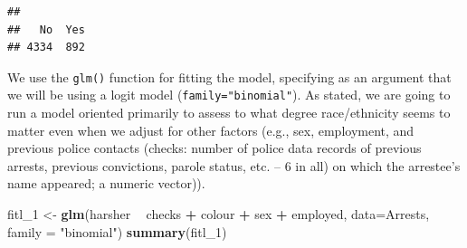 \documentclass[]{book}
\newenvironment{Shaded}{\begin{snugshade}}{\end{snugshade}}
\newcommand{\CommentTok}[1]{\textcolor[rgb]{0.56,0.35,0.01}{\textit{#1}}}
\newcommand{\DataTypeTok}[1]{\textcolor[rgb]{0.13,0.29,0.53}{#1}}
\newcommand{\DecValTok}[1]{\textcolor[rgb]{0.00,0.00,0.81}{#1}}
\newcommand{\KeywordTok}[1]{\textcolor[rgb]{0.13,0.29,0.53}{\textbf{#1}}}
\newcommand{\NormalTok}[1]{#1}
\newcommand{\OperatorTok}[1]{\textcolor[rgb]{0.81,0.36,0.00}{\textbf{#1}}}
\newcommand{\StringTok}[1]{\textcolor[rgb]{0.31,0.60,0.02}{#1}}
\theoremstyle{definition}
\theoremstyle{definition}
\theoremstyle{definition}
\theoremstyle{remark}
\begin{document}
\begin{Shaded}
\end{Shaded}

\begin{verbatim}
## 
##   No  Yes 
## 4334  892
\end{verbatim}

\begin{Shaded}
\end{Shaded}

We use the \texttt{glm()} function for fitting the model, specifying as
an argument that we will be using a logit model
(\texttt{family="binomial"}). As stated, we are going to run a model
oriented primarily to assess to what degree race/ethnicity seems to
matter even when we adjust for other factors (e.g., sex, employment, and
previous police contacts (checks: number of police data records of
previous arrests, previous convictions, parole status, etc. -- 6 in all)
on which the arrestee's name appeared; a numeric vector)).

\begin{Shaded}
\begin{Highlighting}[]
\NormalTok{fitl_}\DecValTok{1}\NormalTok{ <-}\StringTok{ }\KeywordTok{glm}\NormalTok{(harsher }\OperatorTok{~}\StringTok{ }\NormalTok{checks }\OperatorTok{+}\StringTok{ }\NormalTok{colour }\OperatorTok{+}\StringTok{ }\NormalTok{sex }\OperatorTok{+}\StringTok{ }\NormalTok{employed, }\DataTypeTok{data=}\NormalTok{Arrests, }\DataTypeTok{family =} \StringTok{"binomial"}\NormalTok{)}
\KeywordTok{summary}\NormalTok{(fitl_}\DecValTok{1}\NormalTok{)}
\end{Highlighting}
\end{Shaded}
\end{document}
